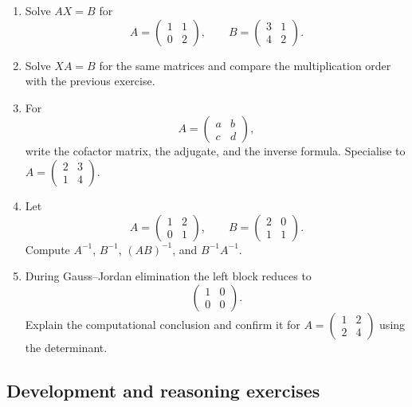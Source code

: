 \begin{enumerate}
\item Solve $AX=B$ for
\[
A=\begin{pmatrix}1&1\\0&2\end{pmatrix},
\qquad
B=\begin{pmatrix}3&1\\4&2\end{pmatrix}.
\]

\item Solve $XA=B$ for the same matrices and compare the multiplication order with the previous exercise.

\item For
\[
A=\begin{pmatrix}a&b\\c&d\end{pmatrix},
\]
write the cofactor matrix, the adjugate, and the inverse formula. Specialise to $A=\begin{pmatrix}2&3\\1&4\end{pmatrix}$.

\item Let
\[
A=\begin{pmatrix}1&2\\0&1\end{pmatrix},
\qquad
B=\begin{pmatrix}2&0\\1&1\end{pmatrix}.
\]
Compute $A^{-1}$, $B^{-1}$, $(AB)^{-1}$, and $B^{-1}A^{-1}$.

\item During Gauss--Jordan elimination the left block reduces to
\[
\begin{pmatrix}1&0\\0&0\end{pmatrix}.
\]
Explain the computational conclusion and confirm it for $A=\begin{pmatrix}1&2\\2&4\end{pmatrix}$ using the determinant.
\end{enumerate}

\subsection{Development and reasoning exercises}

